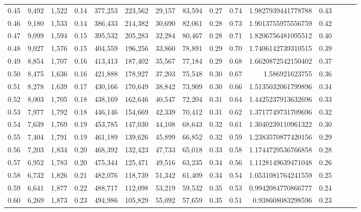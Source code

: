 \begin{tabular}{rrrrrrrrrrrrrrr}
0.45 &   9,492 &  1,522 &  0.14 &  377,253 &  223,562 &   29,157 &   83,594 &  0.27 &  0.74 &      1.9827939441778788 &      0.43 \\
0.46 &   9,180 &  1,533 &  0.14 &  386,433 &  214,382 &   30,690 &   82,061 &  0.28 &  0.73 &      1.9013755975556759 &      0.42 \\
0.47 &   9,099 &  1,594 &  0.15 &  395,532 &  205,283 &   32,284 &   80,467 &  0.28 &  0.71 &      1.8206756481095512 &      0.40 \\
0.48 &   9,027 &  1,576 &  0.15 &  404,559 &  196,256 &   33,860 &   78,891 &  0.29 &  0.70 &      1.7406142739310515 &      0.39 \\
0.49 &   8,854 &  1,707 &  0.16 &  413,413 &  187,402 &   35,567 &   77,184 &  0.29 &  0.68 &      1.6620872542150402 &      0.37 \\
0.50 &   8,475 &  1,636 &  0.16 &  421,888 &  178,927 &   37,203 &   75,548 &  0.30 &  0.67 &          1.586921623755 &      0.36 \\
0.51 &   8,278 &  1,639 &  0.17 &  430,166 &  170,649 &   38,842 &   73,909 &  0.30 &  0.66 &      1.5135032061799896 &      0.34 \\
0.52 &   8,003 &  1,705 &  0.18 &  438,169 &  162,646 &   40,547 &   72,204 &  0.31 &  0.64 &      1.4425237913632696 &      0.33 \\
0.53 &   7,977 &  1,792 &  0.18 &  446,146 &  154,669 &   42,339 &   70,412 &  0.31 &  0.62 &      1.3717749731709696 &      0.32 \\
0.54 &   7,639 &  1,769 &  0.19 &  453,785 &  147,030 &   44,108 &   68,643 &  0.32 &  0.61 &      1.3040239110961322 &      0.30 \\
0.55 &   7,404 &  1,791 &  0.19 &  461,189 &  139,626 &   45,899 &   66,852 &  0.32 &  0.59 &      1.2383570877420156 &      0.29 \\
0.56 &   7,203 &  1,834 &  0.20 &  468,392 &  132,423 &   47,733 &   65,018 &  0.33 &  0.58 &      1.1744729536766858 &      0.28 \\
0.57 &   6,952 &  1,783 &  0.20 &  475,344 &  125,471 &   49,516 &   63,235 &  0.34 &  0.56 &      1.1128149639471048 &      0.26 \\
0.58 &   6,732 &  1,826 &  0.21 &  482,076 &  118,739 &   51,342 &   61,409 &  0.34 &  0.54 &      1.0531081764241559 &      0.25 \\
0.59 &   6,641 &  1,877 &  0.22 &  488,717 &  112,098 &   53,219 &   59,532 &  0.35 &  0.53 &      0.9942084770866777 &      0.24 \\
0.60 &   6,269 &  1,873 &  0.23 &  494,986 &  105,829 &   55,092 &   57,659 &  0.35 &  0.51 &       0.938608083298596 &      0.23 \\

\end{tabular}
